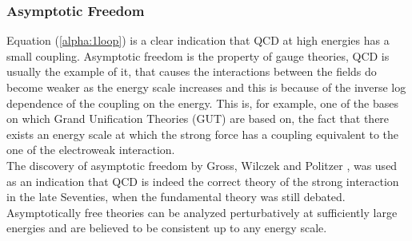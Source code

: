 \subsubsection{Asymptotic Freedom}
Equation (\ref{alpha:1loop}) is a clear indication that QCD at high energies has a small coupling. Asymptotic freedom is the property of gauge theories, QCD is usually the example of it, that causes the interactions between the fields do become weaker as the energy scale increases and this is because of the inverse log dependence of the coupling on the energy. This is, for example, one of the bases on which Grand Unification Theories (GUT) are based on, the fact that there exists an energy scale at which the strong force has a coupling equivalent to the one of the electroweak interaction.  \\
The discovery of asymptotic freedom by Gross, Wilczek and Politzer \cite{Gross-Wilczek}\cite{Politzer},  was used as an indication that QCD is indeed the correct theory of the strong interaction in the late Seventies, when the fundamental theory was still debated.\\
Asymptotically free theories can be analyzed perturbatively at sufficiently large energies and are believed to be consistent up to any energy scale.

